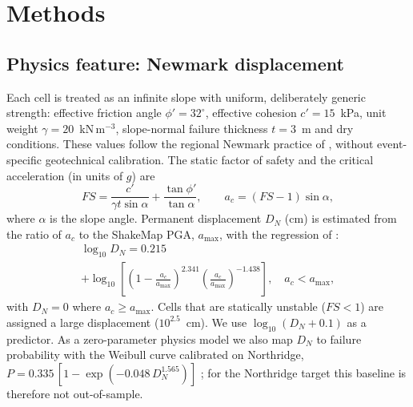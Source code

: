 \section{Methods}\label{sec:methods}

\subsection{Physics feature: Newmark displacement}
Each cell is treated as an infinite slope with uniform, deliberately generic strength: effective friction angle $\phi'=32^\circ$, effective cohesion $c'=15$~kPa, unit weight $\gamma=20$~kN\,m$^{-3}$, slope-normal failure thickness $t=3$~m and dry conditions. These values follow the regional Newmark practice of \citet{jibson2000}, without event-specific geotechnical calibration. The static factor of safety and the critical acceleration (in units of $g$) are
\begin{equation}
FS = \frac{c'}{\gamma t \sin\alpha} + \frac{\tan\phi'}{\tan\alpha}, \qquad a_c = (FS-1)\sin\alpha ,
\end{equation}
where $\alpha$ is the slope angle. Permanent displacement $D_N$ (cm) is estimated from the ratio of $a_c$ to the ShakeMap PGA, $a_{\max}$, with the regression of \citet{jibson2007}:
\begin{multline}
\log_{10} D_N = 0.215 \\ + \log_{10}\!\left[\left(1-\frac{a_c}{a_{\max}}\right)^{2.341}\left(\frac{a_c}{a_{\max}}\right)^{-1.438}\right], \quad a_c<a_{\max},
\end{multline}
with $D_N=0$ where $a_c\ge a_{\max}$. Cells that are statically unstable ($FS<1$) are assigned a large displacement ($10^{2.5}$~cm). We use $\log_{10}(D_N+0.1)$ as a predictor. As a zero-parameter physics model we also map $D_N$ to failure probability with the Weibull curve calibrated on Northridge, $P=0.335\,[1-\exp(-0.048\,D_N^{1.565})]$ \citep{jibson2000}; for the Northridge target this baseline is therefore not out-of-sample.

